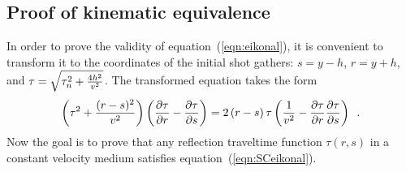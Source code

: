 \subsection{Proof of kinematic equivalence}

In order to prove the validity of equation~(\ref{eqn:eikonal}), it is
convenient to transform it to the coordinates of the initial shot
gathers: $s=y-h$, $r=y+h$, and $\tau = \sqrt{\tau_n^2+{{4h^2} \over
    {v^2}}}$. The transformed equation takes the form
\begin{equation}
\left( \tau^2 + {{(r-s)^2} \over {v^2}} \right) \left( {\partial \tau
\over \partial r} -   {\partial \tau \over \partial s} \right) = 2 \, (r-s) \,
\tau \left( {1 \over {v^2}} - {\partial \tau \over \partial r}
{\partial \tau \over \partial s} \right) \,\,\,.
\label{eqn:SCeikonal} 
\end{equation}
Now the goal is to prove that any reflection traveltime function
$\tau(r,s)$ in a constant velocity medium satisfies 
equation~(\ref{eqn:SCeikonal}). 

